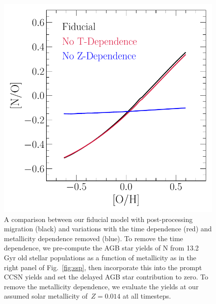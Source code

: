 \documentclass[ms.tex]{subfiles}
\begin{document}
\begin{figure}
\centering
\includegraphics[scale = 0.6]{t_z_dep_comp.pdf}
\caption{
A comparison between our fiducial model with post-processing migration (black)
and variations with the time dependence (red) and metallicity dependence 
removed (blue).
To remove the time dependence, we pre-compute the AGB star yields of N from
13.2 Gyr old stellar populations as a function of metallicity as in the right
panel of Fig.~\ref{fig:ssp}, then incorporate this into the prompt CCSN yields
and set the delayed AGB star contribution to zero.
To remove the metallicity dependence, we evaluate the yields at our assumed
solar metallicity of~$Z = 0.014$ at all timesteps.
}
\label{fig:t_z_dep_comp}
\end{figure}
\end{document}
